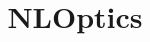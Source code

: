\documentclass[12pt]{article}
\title{\vspace{-2em}NLOptics}
\date{}
\begin{document}
\maketitle

\vspace{-4em}
\begin{multicols}{3}


\end{multicols}
\end{document}
